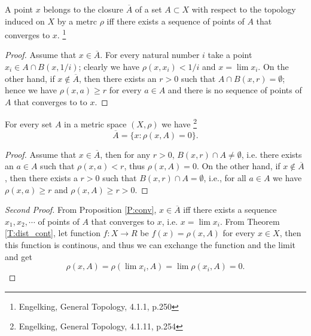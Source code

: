 \begin{proposition} \label{P:conv}
A point $x$ belongs to the closure $\overline{A}$ of a set $A\subset X$ with respect
to the topology induced on $X$ by a metrc $\rho$ iff there exists a sequence of
points of $A$ that converges to $x$.
\footnote{Engelking, General Topology, 4.1.1, p.250}
\end{proposition}
\begin{proof}
Assume that $x\in \overline{A}$. For every natural number $i$ take a point 
$x_i\in A\cap B(x,1/i)$; clearly we have $\rho(x,x_i)<1/i$ and $x=\lim{x_i}$.
On the other hand, if $x\notin \overline{A}$, then there exists an $r>0$ such that
$A\cap B(x,r)=\emptyset$; hence we have $\rho(x,a)\ge r$ for every $a\in A$ and
there is no sequence of points of $A$ that converges to to $x$.
\end{proof}




\begin{corollary} \label{C:closure_m}
For every set $A$ in a metric space $(X,\rho)$ we have
\footnote{Engelking, General Topology, 4.1.11, p.254}
\[
  \overline{A} = \{ x: \rho(x,A)=0  \}.
\]
\end{corollary}
\begin{proof}
Assume that $x\in\overline{A}$, then for any $r>0$, $B(x,r)\cap A\neq\emptyset$, i.e.
there exists an $a\in A$ such that $\rho(x,a)<r$, thus $\rho(x,A)=0$. On the
other hand, if $x\notin \overline{A}$, then there exists a $r>0$ such that
$B(x,r)\cap A=\emptyset$, i.e., for all $a\in A$ we have $\rho(x,a)\ge r$ and
$\rho(x,A)\ge r>0$.
\end{proof}
\begin{proof}[Second Proof]
From Proposition \ref{P:conv}, $x\in \overline{A}$ iff there exists a sequence
$x_1,x_2,\cdots$ of points of $A$ that converges to $x$, i.e. $x=\lim{x_i}$.
From Theorem \ref{T:dist_cont}, let function $f:X\to R$ be 
$f(x)=\rho(x,A)$ for every $x\in X$, then this function is continous,
and thus we can exchange the function and the limit and get
\[
  \rho(x,A)=\rho(\lim{x_i},A)=\lim\rho(x_i,A)=0.
\]
\end{proof}




